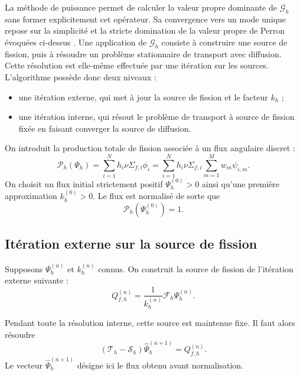 \documentclass{article}
\begin{document}
La méthode de puissance permet de calculer la valeur propre dominante de $\mathcal G_h$ sans former explicitement cet opérateur. Sa convergence vers un mode unique repose sur la simplicité et la stricte domination de la valeur propre de Perron évoquées ci-dessus \cite[chap.~6, section~6.6.3]{Allaire2018}. Une application de $\mathcal G_h$ consiste à construire une source de
fission, puis à résoudre un problème stationnaire de transport avec diffusion. Cette résolution est elle-même effectuée par une itération sur les sources. L'algorithme possède donc deux niveaux :

\begin{itemize}
    \item une itération externe, qui met à jour la source de fission et le facteur $k_h$ ;
    \item une itération interne, qui résout le problème de transport à source de fission fixée en faisant converger la source de diffusion.
\end{itemize}

On introduit la production totale de fission associée à un flux angulaire discret :
\begin{equation}
    \mathcal P_h(\Psi_h)
    = \sum_{i=1}^{N} h_i\nu\Sigma_{f,i}\phi_i
    = \sum_{i=1}^{N} h_i\nu\Sigma_{f,i} \sum_{m=1}^{M}w_m\psi_{i,m}.
    \label{eq:production-fission-transport}
\end{equation}
On choisit un flux initial strictement positif $\Psi_h^{(0)}>0$ ainsi qu'une première approximation $k_h^{(0)}>0$. Le flux est normalisé de sorte que
\[
    \mathcal P_h\!\left(\Psi_h^{(0)}\right)=1.
\]

\subsection {Itération externe sur la source de fission}

Supposons $\Psi_h^{(n)}$ et $k_h^{(n)}$ connus. On construit la source de fission de l'itération externe suivante :
\begin{equation}
    Q_{f,h}^{(n)} = \frac{1}{k_h^{(n)}} \mathcal F_h\Psi_h^{(n)}.
    \label{eq:source-fission-externe}
\end{equation}

Pendant toute la résolution interne, cette source est maintenue fixe. Il faut alors résoudre
\begin{equation}
    \left( \mathcal T_h-\mathcal S_h \right) \widehat{\Psi}_h^{(n+1)} = Q_{f,h}^{(n)}.
    \label{eq:probleme-interne-transport}
\end{equation}
Le vecteur $\widehat{\Psi}_h^{(n+1)}$ désigne ici le flux obtenu avant normalisation.
\end{document}
